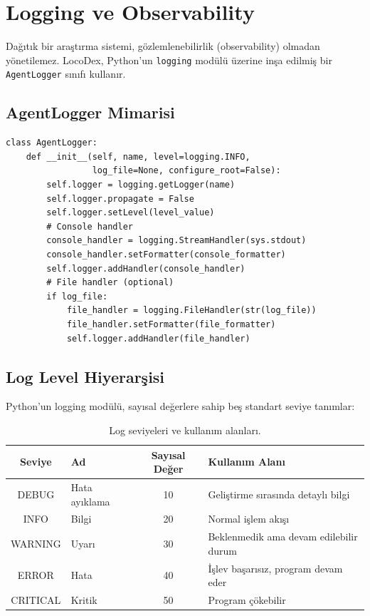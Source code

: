 \section{Logging ve Observability}
\label{sec:logging}

Da\u{g}{\i}t{\i}k bir ara\c{s}t{\i}rma sistemi, g\"{o}zlemlenebilirlik (observability) olmadan y\"{o}netilemez. LocoDex, Python'un \texttt{logging} mod\"{u}l\"{u} \"{u}zerine in\c{s}a edilmi\c{s} bir \texttt{AgentLogger} s{\i}n{\i}f{\i} kullan{\i}r.

\subsection{AgentLogger Mimarisi}

\begin{verbatim}
class AgentLogger:
    def __init__(self, name, level=logging.INFO,
                 log_file=None, configure_root=False):
        self.logger = logging.getLogger(name)
        self.logger.propagate = False
        self.logger.setLevel(level_value)
        # Console handler
        console_handler = logging.StreamHandler(sys.stdout)
        console_handler.setFormatter(console_formatter)
        self.logger.addHandler(console_handler)
        # File handler (optional)
        if log_file:
            file_handler = logging.FileHandler(str(log_file))
            file_handler.setFormatter(file_formatter)
            self.logger.addHandler(file_handler)
\end{verbatim}

\subsection{Log Level Hiyerar\c{s}isi}

Python'un logging mod\"{u}l\"{u}, say{\i}sal de\u{g}erlere sahip be\c{s} standart seviye tan{\i}mlar:

\begin{table}[H]
\centering
\caption{Log seviyeleri ve kullan{\i}m alanlar{\i}.}
\label{tab:log-levels}
\begin{tabular}{clcl}
\toprule
\textbf{Seviye} & \textbf{Ad} & \textbf{Say{\i}sal De\u{g}er} & \textbf{Kullan{\i}m Alan{\i}} \\
\midrule
DEBUG & Hata ay{\i}klama & 10 & Geli\c{s}tirme s{\i}ras{\i}nda detayl{\i} bilgi \\
INFO & Bilgi & 20 & Normal i\c{s}lem ak{\i}\c{s}{\i} \\
WARNING & Uyar{\i} & 30 & Beklenmedik ama devam edilebilir durum \\
ERROR & Hata & 40 & \.{I}\c{s}lev ba\c{s}ar{\i}s{\i}z, program devam eder \\
CRITICAL & Kritik & 50 & Program \c{c}\"{o}kebilir \\
\bottomrule
\end{tabular}
\end{table}

